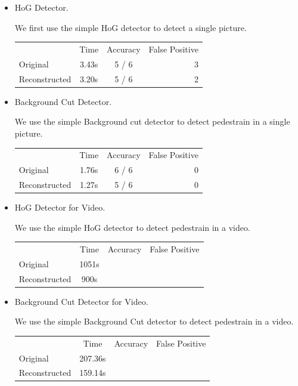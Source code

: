 \documentclass[a4paper]{article}
\begin{document}
\begin{enumerate}
\begin{itemize}
\item HoG Detector.

We first use the simple HoG detector to detect a single picture.
\begin{center}
\begin{tabular}{l | c | c | r}
\hline
                & Time  & Accuracy  & False Positive \\
Original        & 3.43s & 5 / 6     & 3              \\
Reconstructed   & 3.20s & 5 / 6     & 2              \\
\hline
\end{tabular}
\end{center}

\item Background Cut Detector.

We use the simple Background cut detector to detect pedestrain in a single picture.

\begin{center}
\begin{tabular}{l | c | c | r}
\hline
                & Time  & Accuracy  & False Positive \\
Original        & 1.76s & 6 / 6     & 0              \\
Reconstructed   & 1.27s & 5 / 6     & 0              \\
\hline
\end{tabular}
\end{center}

\item HoG Detector for Video.

We use the simple HoG detector to detect pedestrain in a video.

\begin{center}
\begin{tabular}{l | c | c | r}
\hline
                & Time  & Accuracy  & False Positive \\
Original        & 1051s  &           &                \\
Reconstructed   & 900s &           &                \\
\hline
\end{tabular}
\end{center}

\item Background Cut Detector for Video.

We use the simple Background Cut detector to detect pedestrain in a video.

\begin{center}
\begin{tabular}{l | c | c | r}
\hline
                & Time  & Accuracy  & False Positive \\
Original        & 207.36s  &           &                \\
Reconstructed   & 159.14s  &           &                \\
\hline
\end{tabular}
\end{center}


\end{itemize}
\end{enumerate}
\end{document}
